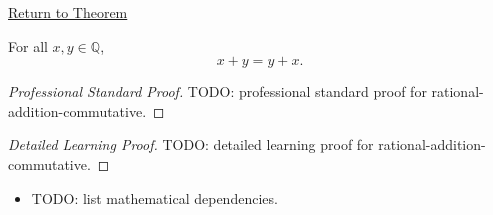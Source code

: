 \newpage
{}
\label{prf:rational-addition-commutative}

\begin{remark*}[Return]
\hyperref[thm:rational-addition-commutative]{Return to Theorem}
\end{remark*}

\begin{theorem*}
For all $x,y\in\mathbb{Q}$,
\[
x+y=y+x.
\]
\end{theorem*}

\begin{proof}[Professional Standard Proof]
\LRAProofBodyStart
TODO: professional standard proof for rational-addition-commutative.
\end{proof}

\begin{proof}[Detailed Learning Proof]
\LRAProofBodyStart
TODO: detailed learning proof for rational-addition-commutative.
\end{proof}

\begin{remark*}
\end{remark*}

\begin{dependencies}
\begin{itemize}
  \item TODO: list mathematical dependencies.
\end{itemize}
\end{dependencies}

\clearpage
